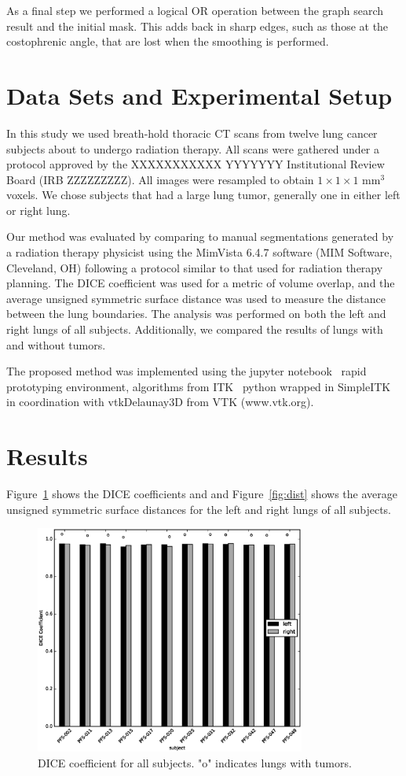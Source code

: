 \documentclass{llncs}
\begin{document}
As a final step we performed a logical OR operation between the graph search result and the initial mask. This adds back in sharp edges, such as those at the costophrenic angle, that are lost when the smoothing is performed.
 

%
\section{Data Sets and Experimental Setup}
%
In this study we used breath-hold thoracic CT scans from twelve lung cancer subjects about to undergo radiation therapy. All scans were gathered under a protocol approved by the 
XXXXXXXXXXX YYYYYYY 
Institutional Review Board 
(IRB ZZZZZZZZZ).
All images were resampled to obtain $1\times{}1\times{}1$ mm$^3$ voxels. We chose subjects that had a large lung tumor, generally one in either left or right lung.

Our method was evaluated by comparing to manual segmentations generated by a radiation therapy physicist using the MimVista 6.4.7 software (MIM Software, Cleveland, OH) following a protocol similar to that used for radiation therapy planning. The DICE coefficient was used for a metric of volume overlap, and the average unsigned symmetric surface distance was used to measure the distance between the lung boundaries. The analysis was performed on both the left and right lungs of all subjects. Additionally, we compared the results of lungs with and without tumors.


The proposed method was implemented using the jupyter notebook~\cite{PER-GRA:2007} rapid prototyping environment,  algorithms from ITK~\cite{johnson2015itk} python wrapped in SimpleITK~\cite{10.3389/fninf.2013.00045} in coordination with vtkDelaunay3D from VTK (www.vtk.org).


%
\section{Results}
%
Figure~\ref{fig:dice} shows the DICE coefficients and and Figure~\ref{fig:dist} shows the average unsigned symmetric surface distances for the left and right lungs of all subjects.
\begin{figure}[t]
  \centering
    \includegraphics[width=3.5in]{figs/dice}
  \caption{DICE coefficient for all subjects. "o" indicates lungs with tumors.}
  \label{fig:dice}
\end{figure}
\end{document}
